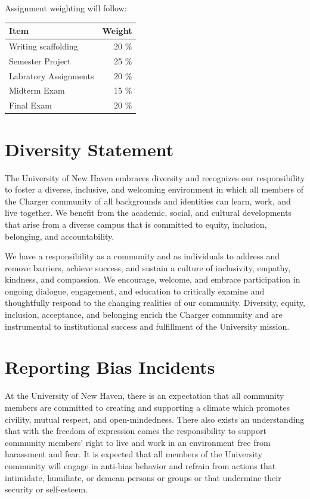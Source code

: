 \documentclass[11pt,]{article}
\begin{document}
Assignment weighting will follow:

\begin{longtable}[]{@{}lr@{}}
\toprule\noalign{}
Item & Weight \\
\midrule\noalign{}
\endhead
\bottomrule\noalign{}
\endlastfoot
Writing scaffolding & 20 \% \\
Semester Project & 25 \% \\
Labratory Assignments & 20 \% \\
Midterm Exam & 15 \% \\
Final Exam & 20 \% \\
\end{longtable}

\hypertarget{diversity-statement}{%
\section{Diversity Statement}\label{diversity-statement}}

The University of New Haven embraces diversity and recognizes our
responsibility to foster a diverse, inclusive, and welcoming environment
in which all members of the Charger community of all backgrounds and
identities can learn, work, and live together. We benefit from the
academic, social, and cultural developments that arise from a diverse
campus that is committed to equity, inclusion, belonging, and
accountability.

We have a responsibility as a community and as individuals to address
and remove barriers, achieve success, and sustain a culture of
inclusivity, empathy, kindness, and compassion. We encourage, welcome,
and embrace participation in ongoing dialogue, engagement, and education
to critically examine and thoughtfully respond to the changing realities
of our community. Diversity, equity, inclusion, acceptance, and
belonging enrich the Charger community and are instrumental to
institutional success and fulfillment of the University mission.

\hypertarget{reporting-bias-incidents}{%
\section{Reporting Bias Incidents}\label{reporting-bias-incidents}}

At the University of New Haven, there is an expectation that all
community members are committed to creating and supporting a climate
which promotes civility, mutual respect, and open-mindedness. There also
exists an understanding that with the freedom of expression comes the
responsibility to support community members' right to live and work in
an environment free from harassment and fear. It is expected that all
members of the University community will engage in anti-bias behavior
and refrain from actions that intimidate, humiliate, or demean persons
or groups or that undermine their security or self-esteem.
\end{document}
